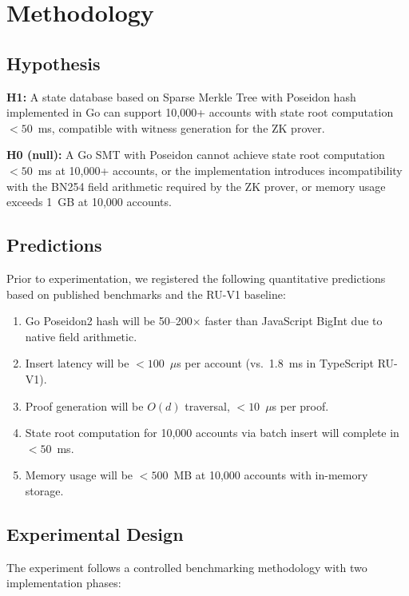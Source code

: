 \section{Methodology}
\label{sec:methodology}

\subsection{Hypothesis}

\textbf{H1:} A state database based on Sparse Merkle Tree with
Poseidon hash implemented in Go can support 10,000+ accounts with
state root computation $< 50$~ms, compatible with witness generation
for the ZK prover.

\textbf{H0 (null):} A Go SMT with Poseidon cannot achieve state root
computation $< 50$~ms at 10,000+ accounts, or the implementation
introduces incompatibility with the BN254 field arithmetic required
by the ZK prover, or memory usage exceeds 1~GB at 10,000 accounts.

\subsection{Predictions}

Prior to experimentation, we registered the following quantitative
predictions based on published benchmarks and the RU-V1 baseline:

\begin{enumerate}
  \item Go Poseidon2 hash will be 50--200$\times$ faster than
    JavaScript BigInt due to native field arithmetic.
  \item Insert latency will be $< 100$~$\mu$s per account
    (vs.\ 1.8~ms in TypeScript RU-V1).
  \item Proof generation will be $O(d)$ traversal, $< 10$~$\mu$s
    per proof.
  \item State root computation for 10,000 accounts via batch insert
    will complete in $< 50$~ms.
  \item Memory usage will be $< 500$~MB at 10,000 accounts with
    in-memory storage.
\end{enumerate}

\subsection{Experimental Design}

The experiment follows a controlled benchmarking methodology with
two implementation phases:

